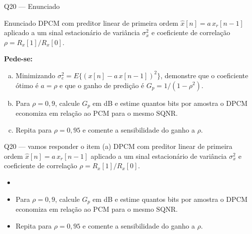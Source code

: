 \documentclass[aspectratio=169]{beamer}
\newcommand{\SQNR}{\mathrm{SQNR}}
\begin{document}
\begin{frame}[allowframebreaks]{Q20 --- Enunciado}
  \small
  \begin{block}{Enunciado}
  DPCM com preditor linear de primeira ordem $\hat x[n]=a\,x_r[n-1]$ aplicado a um sinal estacionário de variância $\sigma_x^2$ e coeficiente de correlação $\rho=R_x[1]/R_x[0]$.
  \end{block}
  \vspace{0.1cm}
  \textbf{Pede-se:}
  \begin{enumerate}[(a)]
    \item Minimizando $\sigma_e^2=E\{(x[n]-a\,x[n-1])^2\}$, demonstre que o coeficiente ótimo é $a=\rho$ e que o ganho de predição é $G_p=1/(1-\rho^2)$.
    \item Para $\rho=0{,}9$, calcule $G_p$ em dB e estime quantos bits por amostra o DPCM economiza em relação ao PCM para o mesmo $\SQNR$.
    \item Repita para $\rho=0{,}95$ e comente a sensibilidade do ganho a $\rho$.
  \end{enumerate}
\end{frame}

\begin{frame}{Q20 --- vamos responder o item (a)}
  \small
  \textcolor{gray!55}{DPCM com preditor linear de primeira ordem $\hat x[n]=a\,x_r[n-1]$ aplicado a um sinal estacionário de variância $\sigma_x^2$ e coeficiente de correlação $\rho=R_x[1]/R_x[0]$.}
  \vspace{0.35cm}
  \begin{itemize}
    \item[\textcolor{unbprimary}{(a)}] 
    \item[\textcolor{gray!55}{(b)}] \textcolor{gray!55}{Para $\rho=0{,}9$, calcule $G_p$ em dB e estime quantos bits por amostra o DPCM economiza em relação ao PCM para o mesmo $\SQNR$.}
    \item[\textcolor{gray!55}{(c)}] \textcolor{gray!55}{Repita para $\rho=0{,}95$ e comente a sensibilidade do ganho a $\rho$.}
  \end{itemize}
\end{frame}
\end{document}
